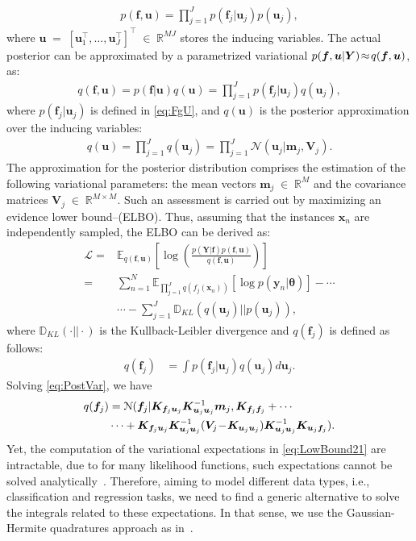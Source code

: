 \documentclass[journal]{IEEEtran}
\providecommand{\ve}[1]{{\bm{#1}}}%
\providecommand{\mat}[1]{{\bm{#1}}} %
\newcommand{\Real}{\mathbb{R}}
\DeclareMathOperator{\en}{\!\,\in\!\,}
\DeclareMathOperator{\igual}{\!\,=\!\,}
\providecommand{\s}[1]{\negthinspace#1\negthinspace}%
\providecommand{\ve}[1]{{\mathbf{#1}}}
\providecommand{\mat}[1]{{\mathbf{#1}}}
\newcommand{\gauss}{\mathcal{N}} %
\begin{document}
\begin{align}
\label{eq:CGPpri}
p({\ve{f}}, {\ve{u}}) = \prod_{j=1}^{J}p(\ve{f}_j|\ve{u}_j)p(\ve{u}_j),
\end{align}
where ${\ve{u}}\igual \left[\ve{u}_1^{\top},\dots, \ve{u}_J^{\top}\right]^{\top}\en \Real^{MJ}$ stores the inducing variables. The actual posterior can be approximated by a parametrized variational $p({\ve{f}},{\ve{u}}|\mat{Y})\s{\approx} q({\ve{f}},{\ve{u}})$, as:
\begin{align}
q({\ve{f}},{\ve{u}}) = p({\ve{f}}|{\ve{u}})q({\ve{u}})= \prod_{j=1}^{J}p(\ve{f}_j|\ve{u}_j)q(\ve{u}_j),
\end{align}
where $p(\ve{f}_j|\ve{u}_j)$ is defined in \cref{eq:FgU}, and $q({\ve{u}})$ is the posterior approximation over the inducing variables:
\begin{align}
\label{eq:QU}
q({\ve{u}}) = \prod_{j=1}^{J}q(\ve{u}_j)=\prod_{j=1}^{J}\gauss\left(\ve{u}_j|\ve{m}_j,\mat{V}_j\right).
\end{align}
The approximation for the posterior distribution comprises the estimation of the following variational parameters: the mean vectors $\ve{m}_j\en \Real^{M}$ and the covariance matrices $\mat{V}_j\en \Real^{M\times M}$. Such an assessment is carried out by maximizing an evidence lower bound--(ELBO). Thus, assuming that the instances $\ve{x}_n$ are independently sampled, the ELBO can be derived as:
\begin{align}
\label{eq:LowBound}
\mathcal{L}=&\mathbb{E}_{q({\ve{f}},{\ve{u}})}\left[\log\left( \frac{p(\mat{Y}|{\ve{f}})p({\ve{f}},{\ve{u}})}{q({\ve{f}},{\ve{u}})}\right)\right]\\
=&\sum_{n=1}^{N}\mathbb{E}_{\prod\limits^J_{j=1}q(f_j(\ve{x}_n))}\left[\log p\left(\ve{y}_n|\bm{\theta}\right)\right]-\cdots\nonumber\\
&\cdots-\sum_{j=1}^{J} \mathbb{D}_{KL}(q(\ve{u}_j)||p(\ve{u}_j))\label{eq:LowBound21},
\end{align}
where $\mathbb{D}_{KL}(\cdot||\cdot)$ is the Kullback-Leibler divergence and $q(\ve{f}_j)$ is defined as follows:
\begin{align}
q(\ve{f}_j) &= \int p(\ve{f}_j|\ve{u}_j)q(\ve{u}_j)d\ve{u}_j.
\label{eq:PostVar}
\end{align}
Solving \cref{eq:PostVar}, we have
\begin{align}
\notag q(\ve{f}_j) &= \gauss(\ve{f}_j|\mat{K}_{\ve{f}_j\ve{u}_j}\mat{K}_{\ve{u}_j\ve{u}_j}^{-1}\ve{m}_j, \mat{K}_{\ve{f}_j\ve{f}_j} + \cdots \\
&\cdots + \mat{K}_{\ve{f}_j\ve{u}_j}\mat{K}_{\ve{u}_j\ve{u}_j}^{-1}(\mat{V}_j\!-\!\mat{K}_{\ve{u}_j\ve{u}_j})\mat{K}_{\ve{u}_j\ve{u}_j}^{-1}\mat{K}_{\ve{u}_j\ve{f}_j}).
\end{align}
Yet, the computation of the variational expectations in \cref{eq:LowBound21} are intractable, due to for many likelihood functions, such expectations cannot be solved analytically~\cite{saul2016chained,moreno2018heterogeneous}. Therefore, aiming to model different data types, i.e., classification and regression tasks, we need to find a generic alternative to solve the integrals related to these expectations. In that sense, we use the Gaussian-Hermite quadratures approach as in~\cite{hensman2015scalable,saul2016chained}. 
\end{document}
